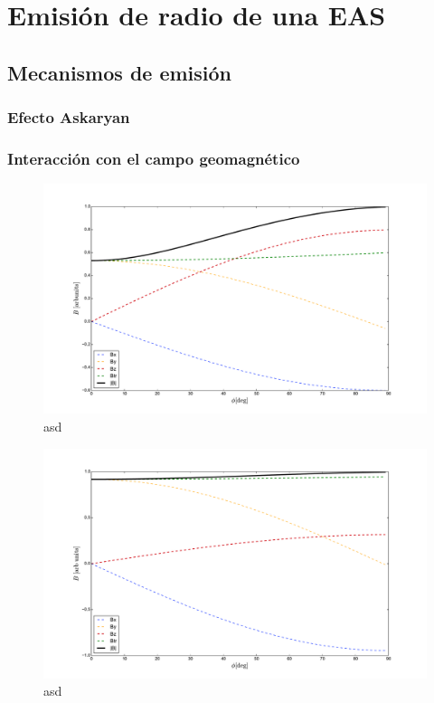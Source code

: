 \chapter{Emisi\'on de radio de una EAS}

\section{Mecanismos de emisi\'on}

	\subsection{Efecto Askaryan}
	
	\subsection{Interacci\'on con el campo geomagn\'etico}
	
	
	\begin{figure}[ht!]
		\centering
		\includegraphics[width=\textwidth]{./fig/EASRadio/geomComps_Malarge}
		\caption{\label{fig:geomComps_Malarge}
		asd
		}
	\end{figure}
	
	\begin{figure}[ht!]
		\centering
		\includegraphics[width=\textwidth]{./fig/EASRadio/geomComps_Tunka}
		\caption{\label{fig:geomComps_Tunka}
		asd
		}
	\end{figure}
	
